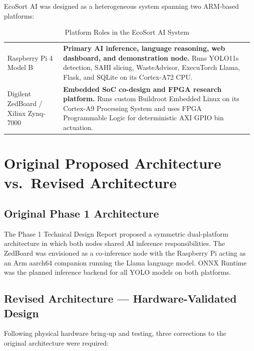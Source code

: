 \documentclass[12pt,a4paper]{article}
\begin{document}
EcoSort AI was designed as a heterogeneous system spanning two ARM-based platforms:

\renewcommand{\arraystretch}{1.30}
\begin{table}[H]
\centering
\caption{Platform Roles in the EcoSort AI System}
\label{tab:platform_roles}
\small
\begin{tabularx}{\linewidth}{@{} L{4.0cm} X @{}}
\toprule
{} &  \\
\midrule
{}
Raspberry Pi 4 Model B
  & \textbf{Primary AI inference, language reasoning, web dashboard, and
    demonstration node.} Runs YOLO11s detection, SAHI slicing, WasteAdvisor,
    ExecuTorch Llama, Flask, and SQLite on its Cortex-A72 CPU. \\
Digilent ZedBoard / Xilinx Zynq-7000
  & \textbf{Embedded SoC co-design and FPGA research platform.} Runs custom
    Buildroot Embedded Linux on its Cortex-A9 Processing System and uses FPGA
    Programmable Logic for deterministic AXI GPIO bin actuation. \\
\bottomrule
\end{tabularx}
\end{table}

\clearpage

\section{Original Proposed Architecture vs.\ Revised Architecture}

\subsection{Original Phase 1 Architecture}

The Phase 1 Technical Design Report proposed a symmetric dual-platform architecture
in which both nodes shared AI inference responsibilities. The ZedBoard was envisioned
as a co-inference node with the Raspberry Pi acting as an Arm aarch64 companion running
the Llama language model. ONNX Runtime was the planned inference backend for all
YOLO models on both platforms.

\subsection{Revised Architecture --- Hardware-Validated Design}

Following physical hardware bring-up and testing, three corrections to the original
architecture were required:
\end{document}
